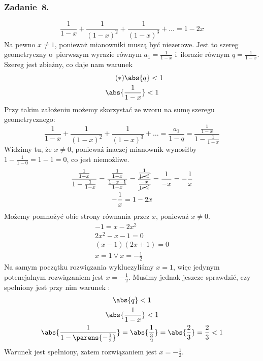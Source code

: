 \subsubsection*{Zadanie~8.}
\begin{equation*}
    \frac{1}{1 - x} + \frac{1}{(1 - x)^2} + \frac{1}{(1 - x)^3} + \ldots = 1 - 2x
\end{equation*}
Na pewno \(x \neq 1\), ponieważ mianowniki muszą być niezerowe. Jest to szereg geometryczny o~pierwszym wyrazie równym \(a_1 = \frac{1}{1 - x}\) i~ilorazie równym \(q = \frac{1}{1 - x}\). Szereg jest zbieżny, co daje nam warunek
\begin{gather*}
    \tag{\(\ast\)} \abs{q} < 1 \label{2020_09_28:8:quotient}\\
    \abs{\frac{1}{1 - x}} < 1
\end{gather*}
Przy takim założeniu możemy skorzystać ze wzoru na sumę szeregu geometrycznego:
\begin{equation*}
    \frac{1}{1 - x} + \frac{1}{(1 - x)^2} + \frac{1}{(1 - x)^3} + \ldots
        = \frac{a_1}{1 - q}
        = \frac{\frac{1}{1 - x}}{1 - \frac{1}{1 - x}}
\end{equation*}
Widzimy tu, że \(x \neq 0\), ponieważ inaczej mianownik wynosiłby \(1 - \frac{1}{1 - 0} = 1 - 1 = 0\), co jest niemożliwe.
\begin{gather*}
    \frac{\frac{1}{1 - x}}{1 - \frac{1}{1 - x}}
        = \frac{\frac{1}{1 - x}}{\frac{1 - x - 1}{1 - x}}
        = \frac{\frac{1}{\cancel{1 - x}}}{\frac{-x}{\cancel{1 - x}}}
        = \frac{1}{-x}
        = -\frac{1}{x}\\
    -\frac{1}{x} = 1 - 2x
\end{gather*}
Możemy pomnożyć obie strony równania przez \(x\), ponieważ \(x \neq 0\).
\begin{gather*}
    -1 = x - 2x^2\\
    2x^2 - x - 1 = 0\\
    (x - 1)(2x + 1) = 0\\
    x = 1 \lor x = -\frac{1}{2}
\end{gather*}
Na samym początku rozwiązania wykluczyliśmy \(x = 1\), więc jedynym potencjalnym rozwiązaniem jest \(x = -\frac{1}{2}\). Musimy jednak jeszcze sprawdzić, czy spełniony jest przy nim warunek :
\begin{gather*}
    \abs{q} < 1\\
    \abs{\frac{1}{1 - x}} < 1\\
    \abs{\frac{1}{1 - \parens{-\frac{1}{2}}}} = \abs{\frac{1}{\frac{3}{2}}} = \abs{\frac{2}{3}} = \frac{2}{3} < 1
\end{gather*}
Warunek jest spełniony, zatem rozwiązaniem jest \(x = -\frac{1}{2}\).
